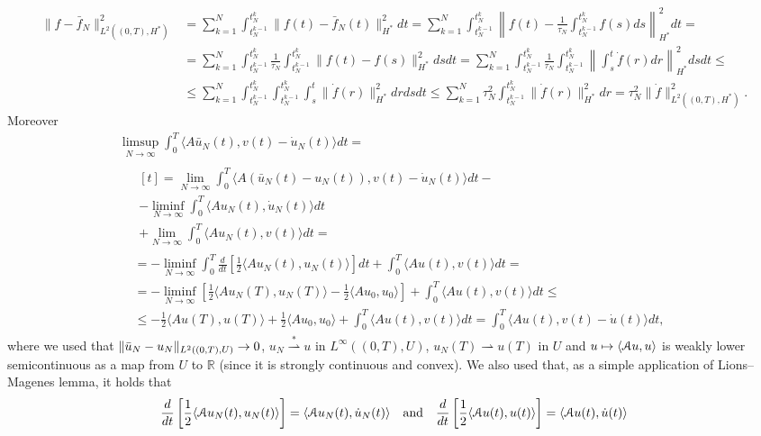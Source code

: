 \documentclass[a4paper,10pt,oneside]{amsbook}
\numberwithin{section}{chapter}
\numberwithin{equation}{chapter}
\theoremstyle{definition}
\DeclarePairedDelimiter{\norm}{\lVert}{\rVert}
\DeclarePairedDelimiter{\dual}{\langle}{\rangle}
\begin{document}
\[
\begin{split}
\|f-\bar{f}_N\|_{L^2((0,T),H^*)}^2&=\sum_{k=1}^N\int_{t_N^{k-1}}^{t_N^k}\|f(t)-\bar{f}_N(t)\|_{H^*}^2dt=\sum_{k=1}^N\int_{t_N^{k-1}}^{t_N^k}\left\|f(t)-\frac{1}{\tau_N}\int_{t_N^{k-1}}^{t_N^k}f(s)ds\right\|_{H^*}^2dt=\\
&=\sum_{k=1}^N\int_{t_N^{k-1}}^{t_N^k}\frac{1}{\tau_N}\int_{t_N^{k-1}}^{t_N^k}\|f(t)-f(s)\|_{H^*}^2dsdt=\sum_{k=1}^N\int_{t_N^{k-1}}^{t_N^k}\frac{1}{\tau_N}\int_{t_N^{k-1}}^{t_N^k}\left\|\int_s^t\dot{f}(r)dr\right\|_{H^*}^2dsdt\le\\
&\le\sum_{k=1}^N\int_{t_N^{k-1}}^{t_N^k}\int_{t_N^{k-1}}^{t_N^k}\int_s^t\|\dot{f}(r)\|_{H^*}^2drdsdt\le\sum_{k=1}^N\tau_N^2\int_{t_N^{k-1}}^{t_N^k}\|\dot{f}(r)\|_{H^*}^2dr=\tau_N^2\|\dot{f}\|_{L^2((0,T),H^*)}^2.
\end{split}
\]
Moreover
\[
\begin{multlined}
\limsup_{N\to\infty}\int_0^T\langle A\bar{u}_N(t),v(t)-\dot{u}_N(t)\rangle dt=\\
\begin{split}
&\begin{multlined}[t]
=\lim_{N\to\infty}\int_0^T\langle A(\bar{u}_N(t)-u_N(t)),v(t)-\dot{u}_N(t)\rangle dt-\\
-\liminf_{N\to\infty}\int_0^T\langle Au_N(t),\dot{u}_N(t)\rangle dt\\+\lim_{N\to\infty}\int_0^T\langle Au_N(t),v(t)\rangle dt=
\end{multlined}\\
&=-\liminf_{N\to\infty}\int_0^T\frac{d}{dt}\left[\frac{1}{2}\langle Au_N(t),u_N(t)\rangle\right]dt+\int_0^T\langle Au(t),v(t)\rangle dt=\\
&=-\liminf_{N\to\infty}\left[\frac{1}{2}\langle Au_N(T),u_N(T)\rangle-\frac{1}{2}\langle Au_0,u_0\rangle\right]+\int_0^T\langle Au(t),v(t)\rangle dt\le\\
&\le-\frac{1}{2}\langle Au(T),u(T)\rangle+\frac{1}{2}\langle Au_0,u_0\rangle+\int_0^T\langle Au(t),v(t)\rangle dt=\int_0^T\langle Au(t),v(t)-\dot{u}(t)\rangle dt,
\end{split}
\end{multlined}
\]
where we used that $\norm{\bar u_N-u_N}_{L^2((0,T),U)}\to0$, $u_N\overset{*}{\rightharpoonup}u$ in $L^\infty((0,T),U)$, $u_N(T)\rightharpoonup u(T)$ in $U$ and $u\mapsto\dual{\mathcal{A}u,u}$ is weakly lower semicontinuous as a map from $U$ to $\mathbb{R}$ (since it is strongly continuous and convex). We also used that, as a simple application of Lions--Magenes lemma, it holds that
\[
\frac{d}{dt}\left[\frac{1}{2}\dual{\mathcal{A}u_N(t),u_N(t)}\right]=\dual{\mathcal{A}u_N(t),\dot u_N(t)}\quad\text{and}\quad\frac{d}{dt}\left[\frac{1}{2}\dual{\mathcal{A}u(t),u(t)}\right]=\dual{\mathcal{A}u(t),\dot u(t)}
\]
\end{document}
